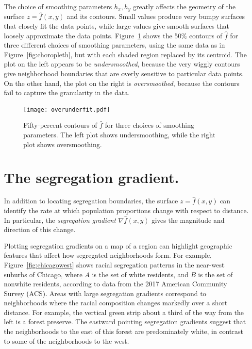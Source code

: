 \documentclass{article}
\theoremstyle{theorem}
\theoremstyle{definition}
\begin{document}
The choice of smoothing parameters $h_x, h_y$ greatly affects the geometry of the surface $z = \hat{f}(x,y)$ and its contours. Small values produce very bumpy surfaces that closely fit the data points, while large values give smooth surfaces that loosely approximate the data points. Figure~\ref{fig:overunderfit} shows the 50\% contours of $\hat{f}$ for three different choices of smoothing parameters, using the same data as in Figure~\ref{fig:choropleth}, but with each shaded region replaced by its centroid. The plot on the left appears to be \textit{undersmoothed}, because the very wiggly contours give neighborhood boundaries that are overly sensitive to particular data points. On the other hand, the plot on the right is \textit{oversmoothed}, because the contours fail to capture the granularity in the data.

\begin{figure}
  \texttt{[image: overunderfit.pdf]}
  \caption{Fifty-percent contours of $\hat{f}$ for three choices of smoothing parameters. The left plot shows undersmoothing, while the right plot shows oversmoothing.}
  \label{fig:overunderfit}
\end{figure}

\section{The segregation gradient.}

In addition to locating segregation boundaries, the surface $z = \hat{f}(x,y)$ can identify the rate at which population proportions change with respect to distance. In particular, the \textit{segregation gradient} $\nabla \hat{f}(x,y)$ gives the magnitude and direction of this change.

Plotting segregation gradients on a map of a region can highlight geographic features that affect how segregated neighborhoods form. For example, Figure~\ref{fig:chicagowest} shows racial segregation patterns in the near-west suburbs of Chicago, where $A$ is the set of white residents, and $B$ is the set of nonwhite residents, according to data from the 2017 American Community Survey (ACS). Areas with large segregation gradients correspond to neighborhoods where the racial composition changes markedly over a short distance. For example, the vertical green strip about a third of the way from the left is a forest preserve. The eastward pointing segregation gradients suggest that the neighborhoods to the east of this forest are predominately white, in contrast to some of the neighborhoods to the west.
\end{document}
